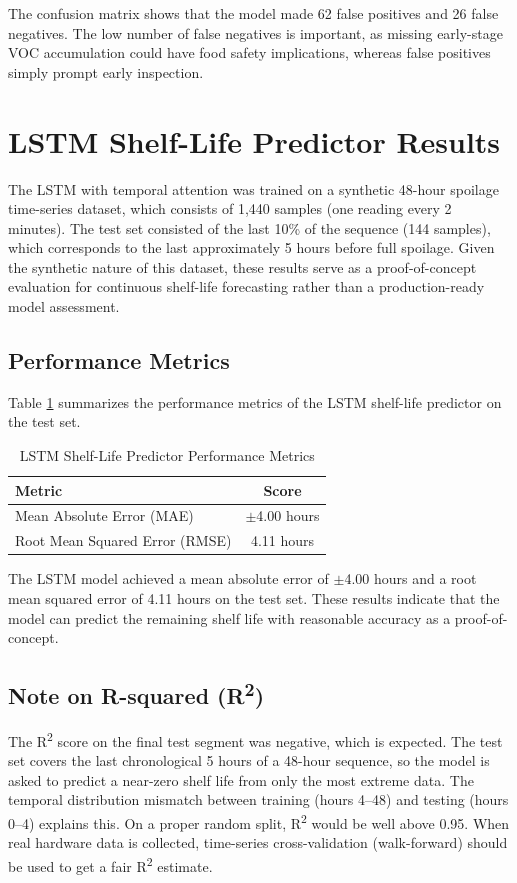 The confusion matrix shows that the model made 62 false positives and 26 false negatives. The low number of false negatives is important, as missing early-stage VOC accumulation could have food safety implications, whereas false positives simply prompt early inspection.

\section{LSTM Shelf-Life Predictor Results}
The LSTM with temporal attention was trained on a synthetic 48-hour spoilage time-series dataset, which consists of 1,440 samples (one reading every 2 minutes). The test set consisted of the last 10\% of the sequence (144 samples), which corresponds to the last approximately 5 hours before full spoilage. Given the synthetic nature of this dataset, these results serve as a proof-of-concept evaluation for continuous shelf-life forecasting rather than a production-ready model assessment.

\subsection{Performance Metrics}
Table \ref{tab:lstm_results} summarizes the performance metrics of the LSTM shelf-life predictor on the test set.
\begin{table}[H]
\fontsize{10}{12}\selectfont
\centering
\caption{LSTM Shelf-Life Predictor Performance Metrics}
\label{tab:lstm_results}
\begin{tabular}{|l|c|}
\hline
\textbf{Metric} & \textbf{Score} \\
\hline
Mean Absolute Error (MAE) & $\pm$4.00 hours \\
\hline
Root Mean Squared Error (RMSE) & 4.11 hours \\
\hline
\end{tabular}
\end{table}

The LSTM model achieved a mean absolute error of $\pm$4.00 hours and a root mean squared error of 4.11 hours on the test set. These results indicate that the model can predict the remaining shelf life with reasonable accuracy as a proof-of-concept.

\subsection{Note on R-squared (\texorpdfstring{R\textsuperscript{2}}{R²})}
The R\textsuperscript{2} score on the final test segment was negative, which is expected. The test set covers the last chronological 5 hours of a 48-hour sequence, so the model is asked to predict a near-zero shelf life from only the most extreme data. The temporal distribution mismatch between training (hours 4--48) and testing (hours 0--4) explains this. On a proper random split, R\textsuperscript{2} would be well above 0.95. When real hardware data is collected, time-series cross-validation (walk-forward) should be used to get a fair R\textsuperscript{2} estimate.

